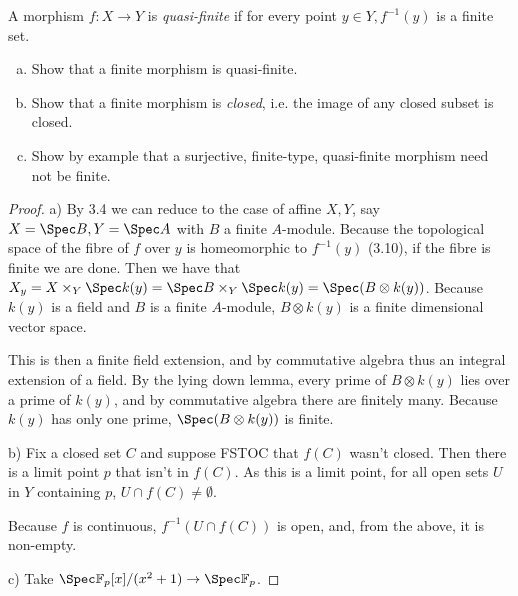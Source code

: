 \begin{exercise}%
	A morphism $f: X\to Y $ is \textit{quasi-finite} if for every point $y \in Y, f^{-1}(y) $ is a finite set.
	\begin{enumerate}[(a)]
		\item Show that a finite morphism is quasi-finite.
		\item Show that a finite morphism is \textit{closed}, i.e. the image of any closed subset is closed.
		\item Show by example that a surjective, finite-type, quasi-finite morphism need not be finite.
	\end{enumerate}
\end{exercise}
\begin{proof}
	a) By 3.4 we can reduce to the case of affine $X,Y $, say $X = \Spec B, Y = \Spec A$ with $B $ a finite $A $-module.
	Because the topological space of the fibre of $f $ over $y $ is homeomorphic to $f^{-1}(y) $ (3.10), if the fibre is finite we are done.
	Then we have that $X_y = X \times _Y \Spec k(y) = \Spec B \times _Y \Spec k(y) = \Spec(B \otimes k(y)) $.
	Because $k(y) $ is a field and $B $ is a finite $A $-module, $B \otimes k(y) $ is a finite dimensional vector space.

	This is then a finite field extension, and by commutative algebra thus an integral extension of a field.
	By the lying down lemma, every prime of $B \otimes k(y) $ lies over a prime of $k(y) $, and by commutative algebra there are finitely many.
	Because $k(y) $ has only one prime, $\Spec(B \otimes k(y)) $ is finite.

	b) Fix a closed set $C $ and suppose FSTOC that $f(C) $ wasn't closed.
	Then there is a limit point $p $ that isn't in $f(C) $.
	As this is a limit point, for all open sets $U $ in $Y $ containing $p $, $U\cap f(C) \ne \emptyset $.

	Because $f $ is continuous, $f^{-1}(U\cap f(C)) $ is open, and, from the above, it is non-empty.

	c) Take $\Spec \mathbb{F}_p[x] / (x^2+1) \to \Spec \mathbb{F}_p $.
\end{proof}


